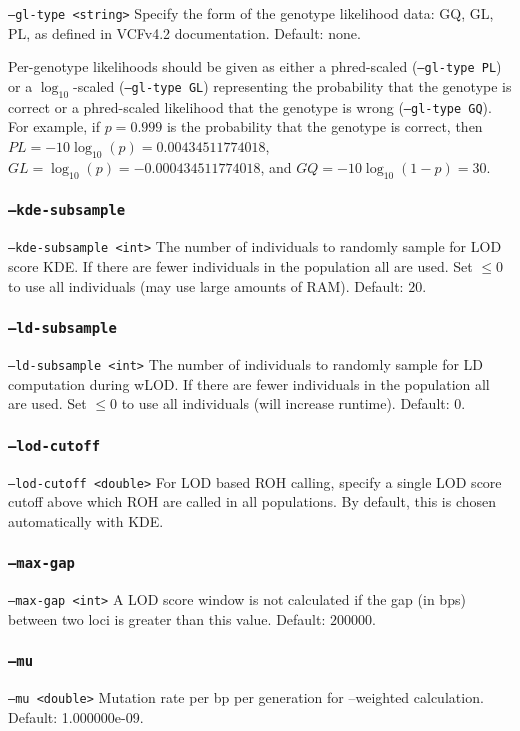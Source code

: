 \documentclass[12pt]{article}%
\begin{document}
{\tt --gl-type <string>} Specify the form of the genotype likelihood data: GQ, GL, PL, as defined in VCFv4.2 documentation. Default: none.

Per-genotype likelihoods should be given as either a phred-scaled ({\tt --gl-type PL}) or a $\log_{10}$-scaled ({\tt --gl-type GL}) representing the probability that the genotype is correct or a phred-scaled likelihood that the genotype is wrong ({\tt --gl-type GQ}).  For example, if $p = 0.999$ is the probability that the genotype is correct, then $PL = -10\log_{10}(p) = 0.00434511774018$, $GL = \log_{10}(p) = -0.000434511774018$, and $GQ = -10\log_{10}(1-p) = 30$.

\subsubsection{{\tt --kde-subsample}}

{\tt --kde-subsample <int>} The number of individuals to randomly sample for LOD score KDE. If there are fewer individuals in the population all are used. Set $\le 0$ to use all individuals (may use large amounts of RAM). Default: $20$.

\subsubsection{{\tt --ld-subsample}}

{\tt --ld-subsample <int>} The number of individuals to randomly sample for LD computation during wLOD. If there are fewer individuals in the population all are used. Set $\le 0$ to use all individuals (will increase runtime). Default: $0$.

\subsubsection{{\tt --lod-cutoff}}
{\tt --lod-cutoff <double>} For LOD based ROH calling, specify a single LOD score cutoff above which ROH are called in all populations.  By default, this is chosen automatically with KDE.

\subsubsection{{\tt --max-gap}}
{\tt --max-gap <int>} A LOD score window is not calculated if the gap (in bps) between two loci is greater than this value. Default: $200000$.

\subsubsection{{\tt --mu}}
{\tt --mu <double>} Mutation rate per bp per generation for --weighted calculation. Default: 1.000000e-09.
\end{document}
